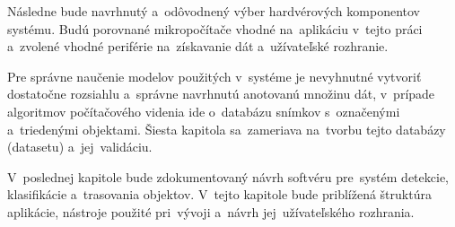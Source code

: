 Následne bude navrhnutý a~odôvodnený výber hardvérových komponentov systému. Budú porovnané mikropočítače vhodné na~aplikáciu v~tejto práci a~zvolené vhodné periférie na~získavanie dát a~užívateľské rozhranie.

Pre správne naučenie modelov použitých v~systéme je nevyhnutné vytvoriť dostatočne rozsiahlu a~správne navrhnutú anotovanú množinu dát, v~prípade algoritmov počítačového videnia ide o~databázu snímkov s~označenými a~triedenými objektami. Šiesta kapitola sa~zameriava na~tvorbu tejto databázy (datasetu) a~jej~validáciu.

V~poslednej kapitole bude zdokumentovaný návrh softvéru pre~systém detekcie, klasifikácie a~trasovania objektov. V~tejto kapitole bude priblížená štruktúra aplikácie, nástroje použité pri~vývoji a~návrh jej~užívateľského rozhrania.

% 
% 
% 
